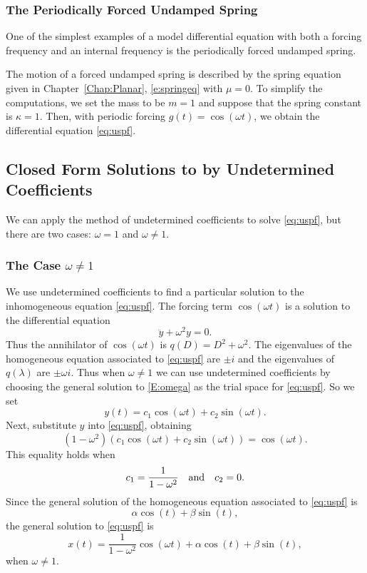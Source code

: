\documentclass{ximera}
\begin{document}
\subsubsection*{The Periodically Forced Undamped Spring}

One of the simplest examples of a model differential equation with both a
forcing frequency and an internal frequency is the periodically forced 
 undamped spring.

The motion of a forced undamped spring is described by the spring equation 
given in Chapter~\ref{Chap:Planar}, \eqref{e:springeq} with $\mu = 0$.
To simplify the computations, we set the mass to be $m=1$ and suppose that 
the spring constant is $\kappa=1$.  Then, with periodic forcing 
$g(t)=\cos(\omega t)$, we obtain the differential equation \eqref{eq:uspf}.

\subsection*{Closed Form Solutions to \protect{\eqref{eq:uspf}} by Undetermined 
Coefficients}

We can apply the method of undetermined coefficients to solve \eqref{eq:uspf}, 
but there are two cases: $\omega=1$ and $\omega\neq 1$. 

\subsubsection*{The Case $\omega\not= 1$}  

We use undetermined coefficients to find a particular solution to the 
inhomogeneous equation \eqref{eq:uspf}.  The forcing term $\cos(\omega t)$ is 
a solution to the differential equation 
\begin{equation}  \label{E:omega}
\ddot{y} + \omega^2y = 0.
\end{equation}
Thus the annihilator 
of $\cos(\omega t)$ is $q(D)=D^2+\omega^2$.  The 
eigenvalues of the homogeneous equation associated to \eqref{eq:uspf} are 
$\pm i$ and the eigenvalues of $q(\lambda)$ are $\pm\omega i$.  Thus when 
$\omega\neq 1$ we can use undetermined coefficients by choosing the general 
solution to \eqref{E:omega} as the trial space 
for \eqref{eq:uspf}.  So we set
\[
y(t) = c_1\cos(\omega t) + c_2\sin(\omega t).
\]
Next, substitute $y$ into \eqref{eq:uspf}, obtaining
\[
(1-\omega ^2)(c_1\cos(\omega t) + c_2\sin(\omega t)) = \cos(\omega t).
\]
This equality holds when 
\[
c_1 = \frac{1}{1-\omega ^2} \quad\mbox{and}\quad c_2=0.
\]
Since the general solution of the 
homogeneous equation associated 
to \eqref{eq:uspf} is
\[
\alpha \cos(t)+\beta\sin(t),
\]
the general solution to \eqref{eq:uspf} is
\[
x(t) =\frac{1}{1-\omega ^2}\cos(\omega t) + \alpha\cos(t) + \beta\sin(t),
\]
when $\omega \neq 1$. 
\end{document}
